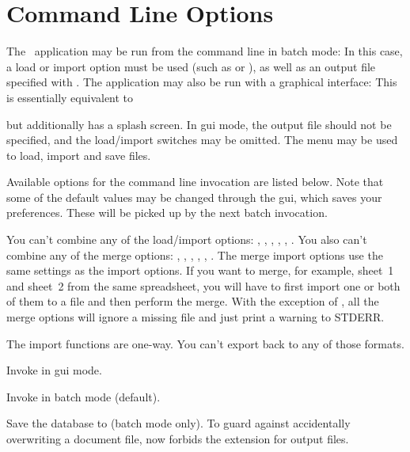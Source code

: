 \section{Command Line Options}
\label{commandoptions}

The \appname\ application may be run from the command line in batch
mode:
In this case, a load or import option must be used (such as
 or ), as well as an output file specified
with . The application may also be run with a
graphical interface:
This is essentially equivalent to
\begin{terminal}
  
\end{terminal}
but additionally has a splash screen. In \gls{gui} mode, the output
file should not be specified, and the load\slash import switches may
be omitted. The  menu may be used to load, import and
save files.

Available options for the command line invocation are listed below.
Note that some of the default values may be changed through the
\gls{gui}, which saves your preferences.  These will be picked up by
the next batch invocation.

You can't combine any of the load/import options: ,
, , , ,
. You also can't combine any of the merge options:
, , ,
, , .
The merge import options use the same settings as the import
options. If you want to merge, for example, sheet~1 and sheet~2 from
the same spreadsheet, you will have to first import one or both of
them to a  file and then perform the merge.  With the
exception of , all the merge options will ignore a
missing file and just print a warning to STDERR.

The import functions are one-way. You can't export back to any of 
those formats.

Invoke  in \gls{gui} mode.

Invoke  in batch mode (default).

Save the database to  (batch mode only).
To guard against accidentally overwriting a document file, 
now forbids the  extension for output files.

